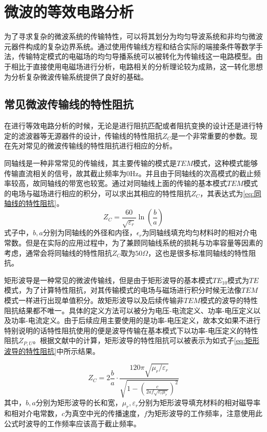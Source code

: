 \documentclass[master]{thesis-uestc}
\begin{document}
\section{微波的等效电路分析}
为了寻求复杂的微波系统的传输特性，可以将其划分为均匀导波系统和非均匀微波元器件构成的复杂边界系统。通过使用传输线方程和结合实际的端接条件等数学手法，传输特定模式的电磁场的均匀导播系统可以被转化为传输线这一电路模型。由于相比于直接使用电磁场进行分析，电路相关的分析理论较为成熟，这一转化思想为分析复杂微波传输系统提供了良好的基础。
\subsection{常见微波传输线的特性阻抗}
在进行等效电路分析的时候，无论是进行阻抗匹配或者阻抗变换的设计还是进行特定的滤波器等无源器件的设计，传输线的特性阻抗\(Z_C\)是一个非常重要的参数。现在先对常见的微波传输线的特性阻抗进行相应的分析。

同轴线是一种非常常见的传输线，其主要传输的模式是\(TEM\)模式，这种模式能够传输直流相关的信号，故其截止频率为0Hz。并且由于同轴线的次高模式的截止频率较高，故同轴线的带宽也较宽。通过对同轴线上面的传输的基本模式\(TEM\)模式的电场与磁场进行相应的积分，可以求出其相应的特性阻抗\(Z_C\)，其表达式为\ref{eq:同轴线的特性阻抗}。
\begin{equation}\label{eq:同轴线的特性阻抗}
    Z_C = \frac{60}{\sqrt{\varepsilon_r}} \ln \left( \frac{b}{a} \right)
\end{equation}
式子中，\(b, a\)分别为同轴线的外径和内径，\(\epsilon_r\)为同轴线填充均匀材料时的相对介电常数。但是在实际的应用过程中，为了兼顾同轴线系统的损耗与功率容量等因素的考虑，通常会将同轴线的特性阻抗\(Z_C\)取为\(50 \Omega\)，这也是很多标准同轴线的特性阻抗。

矩形波导是一种常见的微波传输线，但是由于矩形波导的基本模式\(TE_{10}\)模式为\(TE\)模式，为了计算特性阻抗，对其传输模式的电场与磁场进行积分时候无法像\(TEM\)模式一样进行出现单值积分。故矩形波导以及后续传输非\(TEM\)模式的波导的特性阻抗结果都不唯一。具体的定义方法可以被分为电压-电流定义、功率-电压定义以及功率-电流定义。由于后续应用主要使用的是功率-电压定义，故本文如果不进行特别说明的话特性阻抗使用的便是波导传输在基本模式下以功率-电压定义的特性阻抗\(Z_{P, U}\)。根据文献\cite{heihil_characteristic_2006}中的计算，矩形波导的特性阻抗可以被表示为如式子\ref{eq:矩形波导的特性阻抗}中所示结果。

\begin{equation}\label{eq:矩形波导的特性阻抗}
    Z_{C}=  2\frac{b}{a} \cdot \frac{120 \pi \sqrt{\mu_r / \varepsilon_r}}{\sqrt{1 - \left( \frac{c}{2af \sqrt{\varepsilon_r \mu_r}} \right)^2}} 
\end{equation}
其中，\(b, a\)分别为矩形波导的长和宽，\(\mu_r, \varepsilon_r\)分别为矩形波导填充材料的相对磁导率和相对介电常数，\(c\)为真空中光的传播速度，\(f\)为矩形波导的工作频率，注意使用此公式时波导的工作频率应该高于截止频率。
\end{document}

